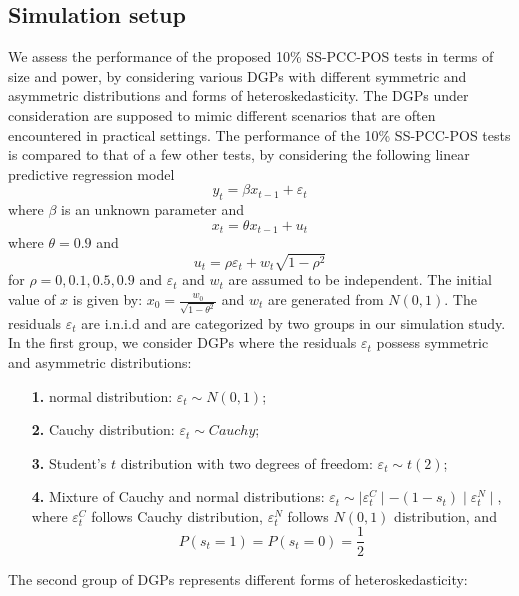 \documentclass[harvard,11pt]{article}
\begin{document}
\subsection{Simulation setup \label{Simulation setup}}
We assess the performance of the proposed 10\% SS-PCC-POS tests in terms of size and power, by considering various DGPs with different symmetric and asymmetric distributions and forms of heteroskedasticity. The DGPs under consideration are supposed to mimic different scenarios that are often encountered in practical settings. The performance of the 10\% SS-PCC-POS tests is compared to that of a few other tests, by considering the following linear predictive regression model
\begin{equation}
 y_t=\beta x_{t-1}+\varepsilon_t
\end{equation}
where $\beta$ is an unknown parameter and
\begin{equation}\label{eq: theta}
x_{t}=\theta x_{t-1}+u_t
\end{equation}
where $\theta=0.9$ and
\begin{equation}\label{eq: errorsim}
u_t=\rho \varepsilon_t+w_t\sqrt{1-\rho^2}
\end{equation}
for $\rho=0,0.1,0.5,0.9$ and $\varepsilon_t$ and $w_t$ are assumed to be independent. The initial value of $x$ is given by: $x_0=\frac{w_0}{\sqrt{1-\theta^2}}$ and $w_t$ are generated from $N(0,1)$. 
The residuals $\varepsilon_t$ are i.n.i.d and are categorized by two groups in our simulation study. In the first group, we consider DGPs where the residuals $\varepsilon_t$ possess symmetric and asymmetric distributions:
\begin{enumerate}
\item[\textbf{1.}] normal distribution: $\varepsilon_t\sim N(0,1)$;
\item[\textbf{2.}] Cauchy distribution: $\varepsilon_t\sim Cauchy$;
\item[\textbf{3.}] Student's $t$ distribution with two degrees of freedom: $\varepsilon_t\sim t(2)$;
\item[\textbf{4.}] Mixture of Cauchy and normal distributions: $\varepsilon_t \sim \mid\varepsilon_t^C\mid-(1-s_t)\mid\varepsilon_t^N\mid$, where $\varepsilon_t^C$ follows Cauchy distribution, $\varepsilon_t^N$ follows $N(0,1)$ distribution, and 
\[
P(s_t=1)=P(s_t=0)=\frac{1}{2}
\] 
\end{enumerate} 
The second group of DGPs represents different forms of heteroskedasticity:
\end{document}
